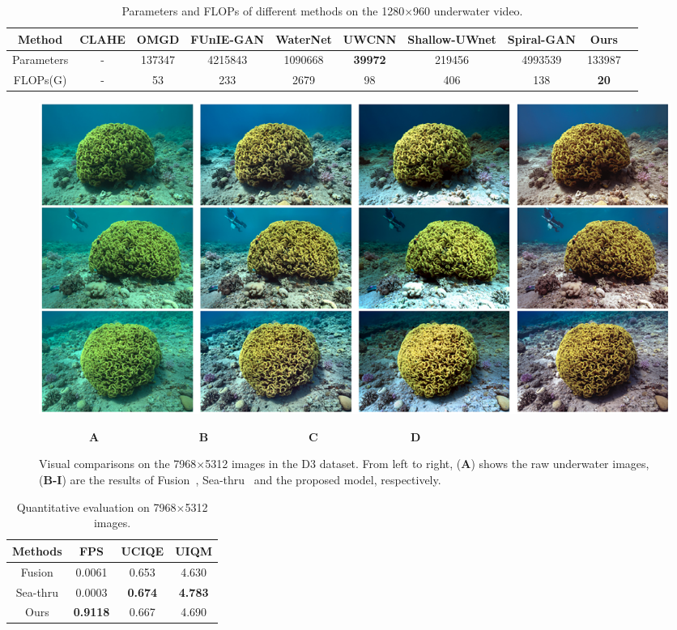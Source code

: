 \documentclass[utf8]{FrontiersinHarvard} %
\begin{document}
\begin{table}[htbp]\normalsize
\centering
\setlength\tabcolsep{2pt}
\caption{Parameters and FLOPs of different methods on the 1280$\times$960 underwater video.}
\begin{tabular}{c|ccccccccc}
\hline  
Method&CLAHE&OMGD&FUnIE-GAN&WaterNet&UWCNN&Shallow-UWnet&Spiral-GAN&Ours\\
\hline 
Parameters&-&137347&4215843&1090668&\textbf{39972}&219456&4993539&133987\\
\hline 
FLOPs(G)&-&53&233&2679&98&406&138&\textbf{20}\\
\hline 
\end{tabular}
\label{tbl:comparison-underwatervideo}
\end{table}

\begin{figure}[htbp]
\begin{center}
\includegraphics[width=1\textwidth]{FSpiralGAN_frontiers/onepicture/D3300.jpg}
\end{center}
$~~~~~~~~~~~~~~~~~~~~$\textbf{A}$~~~~~~~~~~~~~~~~~~~~~~~~~~~~~~~~~~~~~~~~$\textbf{B}$~~~~~~~~~~~~~~~~~~~~~~~~~~~~~~~~~~~~~~~~$\textbf{C}$~~~~~~~~~~~~~~~~~~~~~~~~~~~~~~~~~~~~~$\textbf{D}
 \caption{{Visual comparisons on the 7968$\times$5312 images in the D3 dataset. From left to right, (\textbf{A}) shows the raw underwater images, (\textbf{B-I}) are the results of Fusion~\citep{2012Enhancing}, Sea-thru~\citep{akkaynak2019sea} and the proposed model, respectively.} \label{fig:D3}}
\end{figure}

\begin{table}[htbp]\normalsize
\centering
\setlength\tabcolsep{15pt}
\caption{{Quantitative evaluation on 7968$\times$5312 images.}}
\begin{tabular}{c|ccc}
\hline  
Methods&FPS&UCIQE&UIQM\\
\hline 
Fusion&0.0061&0.653&4.630\\ 
\hline
Sea-thru&0.0003&\textbf{0.674}&\textbf{4.783}\\
\hline
Ours&\textbf{0.9118}&0.667&4.690\\
\hline 
\end{tabular}
\label{tbl:D3}
\end{table}
\end{document}
